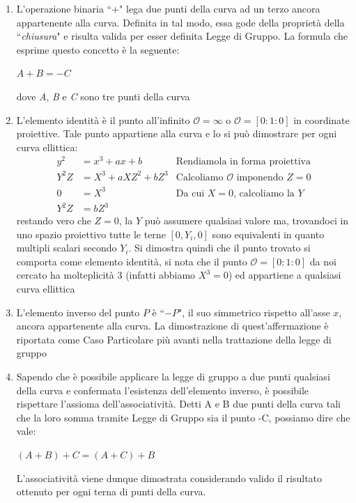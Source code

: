 \documentclass[a4paper,12pt]{tesiinfo}
\begin{document}
\begin{enumerate}
%
 \item L'operazione binaria ``+" lega due punti della curva ad un terzo ancora appartenente alla curva. Definita in tal modo, essa gode della propriet\`a della ``\textit{chiusura}" e risulta valida per esser definita Legge di Gruppo. La formula che esprime questo concetto \`e la seguente:
 \begin{center}
 $A+B=-C$
 \end{center}
 dove \textit{A}, \textit{B} e \textit{C} sono tre punti della curva
 \item L'elemento identit\`a \`e il punto all'infinito $\mathcal{O} = \infty$ o $\mathcal{O} = [0:1:0]$ in coordinate proiettive. Tale punto appartiene alla curva e lo si pu\`o dimostrare \cite{Wolfram} per ogni curva ellittica:
 \begin{align*}
    y^2 &= x^3 + ax + b &\text{Rendiamola in forma proiettiva}\\
    Y^2Z &= X^3 + aXZ^2 + bZ^3 &\text{Calcoliamo $\mathcal{O}$ imponendo }Z=0\\
    0 &= X^3 &\text{Da cui }X=0\text{, calcoliamo la }Y\\
    Y^2Z &= bZ^3
 \end{align*}
 restando vero che $Z=0$, la $Y$ pu\`o assumere qualsiasi valore ma, trovandoci in uno spazio proiettivo tutte le terne $[0, Y_i, 0]$ sono equivalenti in quanto multipli scalari secondo $Y_i$. Si dimostra quindi che il punto trovato si comporta come elemento identit\`a, si nota che il punto $\mathcal{O} = [0:1:0]$ da noi cercato ha molteplicit\`a 3 (infatti abbiamo $X^3=0$) ed appartiene a qualsiasi curva ellittica
 \item L'elemento inverso del punto $P$ \`e ``$-P$", il suo simmetrico rispetto all'asse $x$, ancora appartenente alla curva. La dimostrazione di quest'affermazione \`e riportata come Caso Particolare pi\`u avanti nella trattazione della legge di gruppo
 \item Sapendo che \`e possibile applicare la legge di gruppo a due punti qualsiasi della curva e confermata l'esistenza dell'elemento inverso, \`e possibile rispettare l'assioma dell'associativit\`a. Detti A e B due punti della curva tali che la loro somma tramite Legge di Gruppo sia il punto -C, possiamo dire che vale:
 \begin{center}
 $(A+B)+C=(A+C)+B$
 \end{center}
L'associativit\`a viene dunque dimostrata considerando valido il risultato ottenuto per ogni terna di punti della curva.
\end{enumerate}
\end{document}
